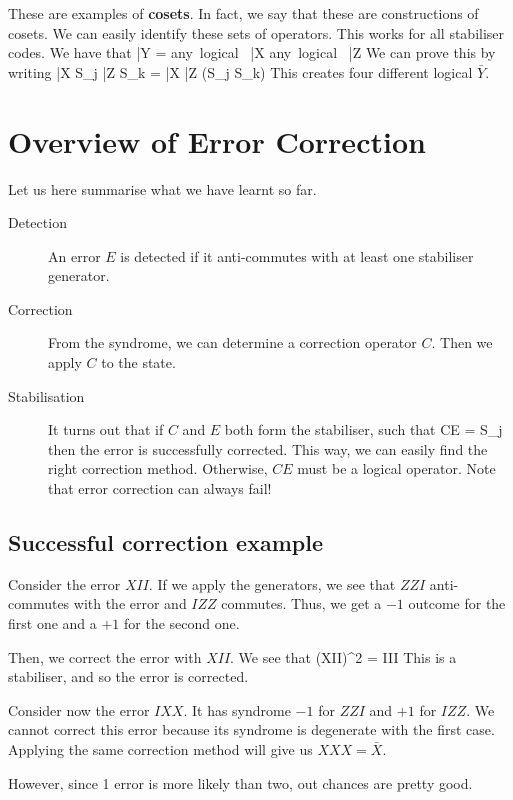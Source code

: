 These are examples of \textbf{cosets}. In fact, we say that these are constructions of cosets. We can easily identify these sets of operators. This works for all stabiliser codes. We have that 
\beq
\bar{Y} = \mbox{any logical } \bar{X} \times  \mbox{any logical } \bar{Z}
\eeq
We can prove this by writing
\beq
\bar{X} S_j \bar{Z} S_k = \bar{X} \bar{Z} (S_j S_k)
\eeq
This creates four different logical $\bar{Y}$. 

\section{Overview of Error Correction}
Let us here summarise what we have learnt so far. 

\begin{description}
\item[Detection] An error $E$ is detected if it anti-commutes with at least one stabiliser generator. 

\item[Correction] From the syndrome, we can determine a correction operator $C$. Then we apply  $C$ to the state. 
 
\item[Stabilisation] It turns out that if $C$ and $E$ both form the stabiliser, such that 
\beq
CE \ket{\psi} = S_j  \ket{\psi}
\eeq
then the error is successfully corrected. This way, we can easily find the right correction method. Otherwise, $CE$ must be a logical operator. Note that error correction can always fail!

\end{description}

\subsection{Successful correction example}
Consider the error $XII$. If we apply the generators, we see that $ZZI$ anti-commutes with the error and $IZZ$ commutes. Thus, we get a $-1$ outcome for the first one and a $+1$ for the second one. 

Then, we correct the error with $XII$. We see that
\beq
(XII)^2 = III
\eeq
This is a stabiliser, and so the error is corrected. 

Consider now the error $IXX$. It has syndrome $-1$ for $ZZI$ and $+1$ for $IZZ$. We cannot correct this error because its syndrome is degenerate with the first case. Applying the same correction method will give us $XXX = \bar{X}$. 

However, since 1 error is more likely than two, out chances are pretty good. 

